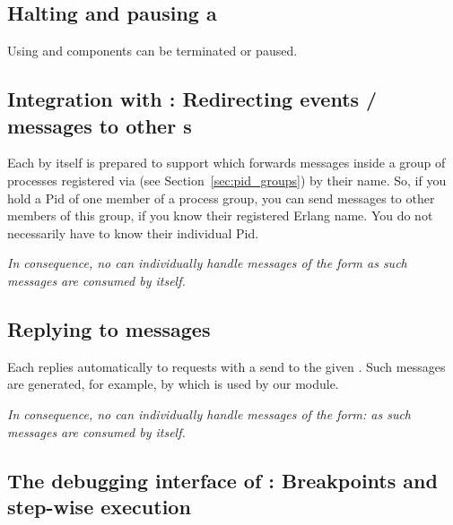 \subsection{\texorpdfstring{Halting and pausing a }
{Halting and pausing a gen\_component}}

Using  and
 components can be terminated or
paused.

\subsection{\texorpdfstring{Integration with :
  Redirecting events / messages  to other s}
  {Integration with pid\_groups:
  Redirecting events / messages  to other gen\_components}}

Each  by itself is prepared to support
 which forwards messages inside a
group of processes registered via  (see
Section~\ref{sec:pid_groups}) by their name. So, if you hold a Pid
of one member of a process group, you can send messages to other members of
this group, if you know their registered Erlang name. You do not necessarily
have to know their individual Pid.

\emph{In consequence, no  can individually handle
  messages of the form  \code{_, _\}} as such
  messages are consumed by  itself.}

\subsection{\texorpdfstring{Replying to  messages}
  {Replying to ping messages}}

Each  replies automatically to  requests with a  send to the given .  Such
messages are generated, for example, by  which is used
by our  module.

\emph{In consequence, no  can individually handle
messages of the form:  as such messages are consumed by
 itself.}


\subsection{\texorpdfstring{The debugging interface of :
  Breakpoints and step-wise execution}
  {The debugging interface of gen\_component: Breakpoints and step-wise execution}}

